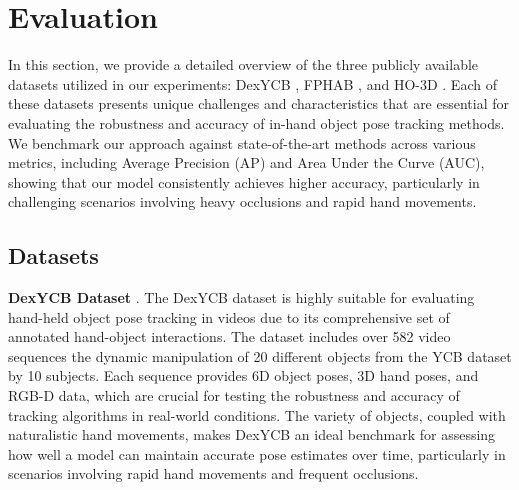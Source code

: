 \section{Evaluation}
\label{sec:Evaluation}

In this section, we provide a detailed overview of the three publicly available datasets utilized in our experiments: DexYCB \cite{chao2021dexycb}, FPHAB \cite{garcia2018first}, and HO-3D \cite{hampali2020honnotate}. Each of these datasets presents unique challenges and characteristics that are essential for evaluating the robustness and accuracy of in-hand object pose tracking methods. We benchmark our approach against state-of-the-art methods across various metrics, including Average Precision (AP) and Area Under the Curve (AUC), showing that our model consistently achieves higher accuracy, particularly in challenging scenarios involving heavy occlusions and rapid hand movements.

\subsection{Datasets}

\textbf{DexYCB Dataset} \cite{chao2021dexycb}. The DexYCB dataset is highly suitable for evaluating hand-held object pose tracking in videos due to its comprehensive set of annotated hand-object interactions. The dataset includes over 582 video sequences \DIFdelbegin {}\DIFdelend \DIFaddbegin {}\DIFaddend the dynamic manipulation of 20 different objects from the YCB dataset by 10 subjects. Each sequence provides 6D object poses, 3D hand poses, and RGB-D data, which are crucial for testing the robustness and accuracy of tracking algorithms in real-world conditions. The variety of objects, coupled with \DIFdelbegin {}\DIFdelend naturalistic hand movements, makes DexYCB an ideal benchmark for assessing how well a model can maintain accurate pose estimates over time, particularly in scenarios involving rapid hand movements and frequent occlusions. \DIFaddbegin {}\DIFaddend 


